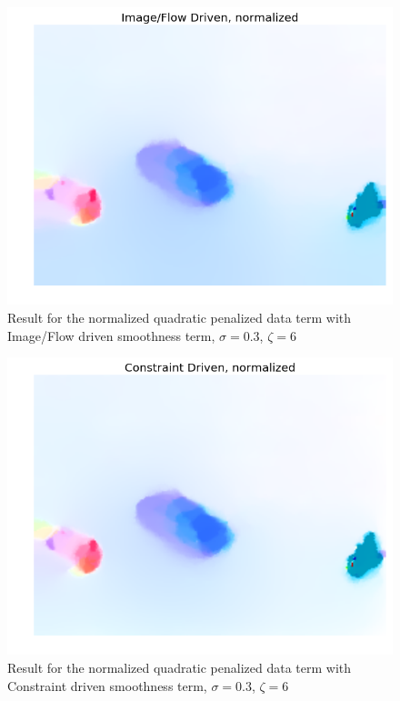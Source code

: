 \documentclass[10pt,a4paper]{article}
\begin{document}
\begin{figure}
    \centering
    \includegraphics[scale=0.7]{Thesis/Figures/IFD_normalized}
    \caption{Result for the normalized quadratic penalized data term with Image/Flow driven smoothness term, $\sigma=0.3$, $\zeta = 6$}
    \label{IFD_normalized}
\end{figure}

\begin{figure}
    \centering
    \includegraphics[scale=0.7]{Thesis/Figures/CR_normalized}
    \caption{Result for the normalized quadratic penalized data term with Constraint driven smoothness term, $\sigma=0.3$, $\zeta = 6$}
    \label{CR_normalized}
\end{figure}
\end{document}
